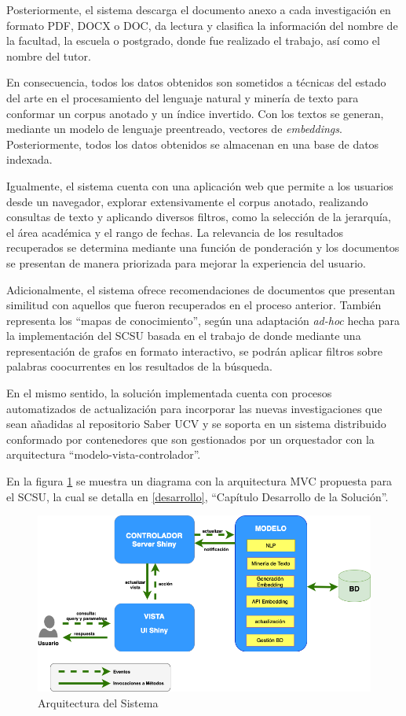 \documentclass[
  12pt,
  openany]{book}
\begin{document}
Posteriormente, el sistema descarga el documento anexo a cada investigación en formato PDF, DOCX o DOC, da lectura y clasifica la información del nombre de la facultad, la escuela o postgrado, donde fue realizado el trabajo, así como el nombre del tutor.

En consecuencia, todos los datos obtenidos son sometidos a técnicas del estado del arte en el procesamiento del lenguaje natural y minería de texto para conformar un corpus anotado y un índice invertido. Con los textos se generan, mediante un modelo de lenguaje preentreado, vectores de \emph{embeddings}. Posteriormente, todos los datos obtenidos se almacenan en una base de datos indexada.

Igualmente, el sistema cuenta con una aplicación web que permite a los usuarios desde un navegador, explorar extensivamente el corpus anotado, realizando consultas de texto y aplicando diversos filtros, como la selección de la jerarquía, el área académica y el rango de fechas. La relevancia de los resultados recuperados se determina mediante una función de ponderación y los documentos se presentan de manera priorizada para mejorar la experiencia del usuario.

Adicionalmente, el sistema ofrece recomendaciones de documentos que presentan similitud con aquellos que fueron recuperados en el proceso anterior. También representa los ``mapas de conocimiento'', según una adaptación \emph{ad-hoc} hecha para la implementación del SCSU basada en el trabajo de \citep{dueñas2011} donde mediante una representación de grafos en formato interactivo, se podrán aplicar filtros sobre palabras coocurrentes en los resultados de la búsqueda.

En el mismo sentido, la solución implementada cuenta con procesos automatizados de actualización para incorporar las nuevas investigaciones que sean añadidas al repositorio Saber UCV y se soporta en un sistema distribuido conformado por contenedores que son gestionados por un orquestador con la arquitectura ``modelo-vista-controlador''.

En la figura \ref{fig:arquitecturasri} se muestra un diagrama con la arquitectura MVC propuesta para el SCSU, la cual se detalla en \ref{desarrollo}, ``Capítulo Desarrollo de la Solución''.

\begin{figure}

{\centering \includegraphics[width=0.9\linewidth]{images/05-desarrollo/MVC9} 

}

\caption{Arquitectura del Sistema}\label{fig:arquitecturasri}
\end{figure}
\end{document}
